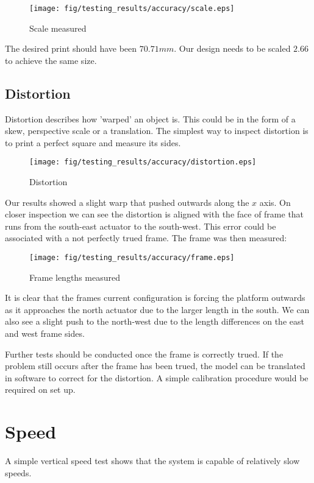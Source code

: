 \documentclass[a4paper, 11pt, twoside]{Thesis}  %
\begin{document}
\begin{figure}[H]
\centering%
\texttt{[image: fig/testing\_results/accuracy/scale.eps]}
\caption{Scale measured}
\label{fig:scale.eps}
\end{figure}
The desired print should have been $70.71mm$. Our design needs to be scaled $2.66$ to achieve the same size.

\subsection{Distortion}

Distortion describes how 'warped' an object is. This could be in the form of a skew, perspective scale or a translation. The simplest way to inspect distortion is to print a  perfect square and measure its sides. 

\begin{figure}[H]
\centering%
\texttt{[image: fig/testing\_results/accuracy/distortion.eps]}
\caption{Distortion}
\label{fig:distortion.eps}
\end{figure}
Our results showed a slight warp that pushed outwards along the $x$ axis. On closer inspection we can see the distortion is aligned with the face of frame that runs from the south-east actuator to the south-west. This error could be associated with a not perfectly trued frame. The frame was then measured:

\begin{figure}[H]
\centering%
\texttt{[image: fig/testing\_results/accuracy/frame.eps]}
\caption{Frame lengths measured}
\label{fig:frame.eps}
\end{figure}
It is clear that the frames current configuration is forcing the platform outwards as it approaches the north actuator due to the larger length in the south. We can also see a slight push to the north-west due to the length differences on the east and west frame sides.

Further tests should be conducted once the frame is correctly trued. If the problem still occurs after the frame has been trued, the model can be translated in software to correct for the distortion. A simple calibration procedure would be required on set up. 




\section{Speed}

A simple vertical speed test shows that the system is capable of relatively slow speeds.
\end{document}

